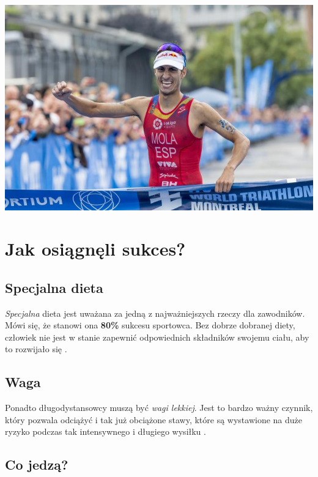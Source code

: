 \documentclass[12pt]{article}
\begin{document}
\begin{flushright}
\includegraphics[width=0.3 \paperwidth]{siedem.jpg}
\end{flushright}

\section{Jak osiągnęli sukces?}
\subsection{Specjalna dieta}
\noindent \emph{Specjalna} dieta jest uważana za jedną z najważniejszych rzeczy dla zawodników. Mówi się, że stanowi ona \textbf{ 80\%} sukcesu sportowca. Bez dobrze dobranej diety, człowiek nie jest w stanie zapewnić odpowiednich składników swojemu ciału, aby to rozwijało się \cite{watzlawik83}.

\subsection{Waga}
\noindent Ponadto długodystansowcy muszą być \textit{wagi lekkiej}. Jest to bardzo ważny czynnik, który pozwala odciążyć i tak już obciążone stawy, które są wystawione na duże ryzyko podczas tak intensywnego i długiego wysiłku \cite{lukruz20}.
\subsection{Co jedzą?}
\end{document}
